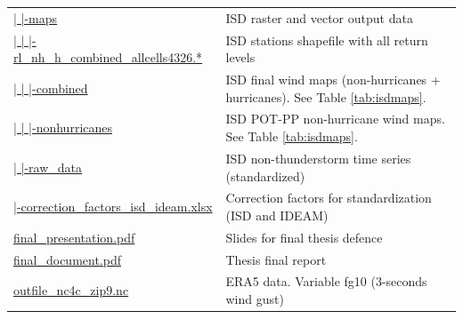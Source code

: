 \documentclass[12pt,oneside]{reedthesis}
\begin{document}
\begin{longtable}[t]{>{\raggedright\arraybackslash}p{2.2in}>{\raggedright\arraybackslash}p{4in}}
\href{ftp://ftp.geocorp.co/windthesis/potpp/isd/maps/}{  |    |-maps} & ISD raster and vector output data\\
\href{ftp://ftp.geocorp.co/windthesis/potpp/isd/maps/}{  |    |    |-rl\_nh\_h\_combined\_allcells4326.*} & ISD stations shapefile with all return levels\\
\href{ftp://ftp.geocorp.co/windthesis/potpp/isd/maps/combined/}{  |    |    |-combined} & ISD final wind maps (non-hurricanes + hurricanes). See Table \ref{tab:isdmaps}.\\
\href{ftp://ftp.geocorp.co/windthesis/potpp/isd/maps/nonhurricanes/}{  |    |    |-nonhurricanes} & ISD POT-PP non-hurricane wind maps. See Table \ref{tab:isdmaps}.\\
\href{ftp://ftp.geocorp.co/windthesis/potpp/isd/raw_data/}{  |    |-raw\_data} & ISD non-thunderstorm time series (standardized)\\
\href{ftp://ftp.geocorp.co/windthesis/potpp/correction_factors_isd_ideam.xlsx}{  |-correction\_factors\_isd\_ideam.xlsx} & Correction factors for standardization (ISD and IDEAM)\\
\href{ftp://ftp.geocorp.co/windthesis/final_presentation.pdf}{final\_presentation.pdf} & Slides for final thesis defence\\
\href{ftp://ftp.geocorp.co/windthesis/final_document.pdf}{final\_document.pdf} & Thesis final report\\
\href{ftp://ftp.geocorp.co/windthesis/outfile_nc4c_zip9.nc}{outfile\_nc4c\_zip9.nc} & ERA5 data. Variable fg10 (3-seconds wind gust)\\
\bottomrule
\end{longtable}
\endgroup{}
\end{document}
